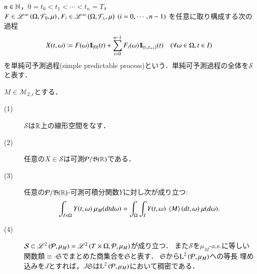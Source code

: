 	\begin{screen}
		\begin{dfn}[単純可予測過程]
			$n \in \mathbb{N}$，$0=t_0 < t_1 < \cdots < t_n = T$，
			$F \in \mathscr{L}^{\infty} \left(\Omega,\mathcal{F}_0,\mu\right),F_i \in \mathscr{L}^{\infty} \left(\Omega,\mathcal{F}_{t_i},\mu\right)\ (i=0,\cdots,n-1)$
			を任意に取り構成する次の過程
			\begin{align}
				X(t,\omega) \coloneqq F(\omega) \mbox{1}\hspace{-0.25em}\mbox{l}_{\{0\}} (t) + \sum_{i=0}^{n-1} F_i(\omega) \mbox{1}\hspace{-0.25em}\mbox{l}_{\left(t_i,t_{i+1}\right]}(t)
				\quad (\forall \omega \in \Omega,t \in I)
				\label{eq:dfn_simple_predictable_process}
			\end{align}
			を単純可予測過程(simple predictable process)という．単純可予測過程の全体を$\mathcal{S}$と表す．
			\label{dfn:predictable_simple_process}
		\end{dfn}
	\end{screen}
	
	\begin{screen}
		\begin{lem}[単純可予測過程の性質]
			$M \in \mathcal{M}_{2,c}$とする．
			\begin{description}
				\item[(1)] $\mathcal{S}$は$\mathbb{R}$上の線形空間をなす．
				\item[(2)] 任意の$X \in \mathcal{S}$は可測$\mathcal{P}/\mathfrak{B}(\mathbb{R})$である．
				\item[(3)] 任意の$\mathcal{P}/\mathfrak{B}(\mathbb{R})$-可測可積分関数$Y$に対し次が成り立つ:
					\begin{align}
						\int_{I \times \Omega} Y(t,\omega)\ \mu_M(dtd\omega)
						= \int_\Omega \int_I Y(t,\omega)\ \inprod<M>(dt,\omega)\ \mu(d\omega).
						\label{eq:lem_properties_of_simple_predictable_processes_0}
					\end{align}
				\item[(4)] $\mathcal{S} \subset \mathscr{L}^{2} \left(\mathcal{P},\mu_M\right) = \mathscr{L}^{2} \left(T \times \Omega,\mathcal{P},\mu_M\right)$が成り立つ．
					また$\mathcal{S}$を$\mu_M$-a.s.に等しい関数類$\equiv{\cdot}{\mathfrak{S}}$でまとめた商集合を$\mathfrak{S}$と表す．
					$\mathfrak{S}$から$\operatorname{L}^{2} \left(\mathcal{P},\mu_M\right)$への等長\footnotemark
					埋め込みを$J$とすれば，$J\mathfrak{S}$は$\operatorname{L}^{2} \left(\mathcal{P},\mu_M\right)$において稠密である．
			\end{description}
			\label{lem:properties_of_simple_predictable_processes}
		\end{lem}
	\end{screen}
	
	
